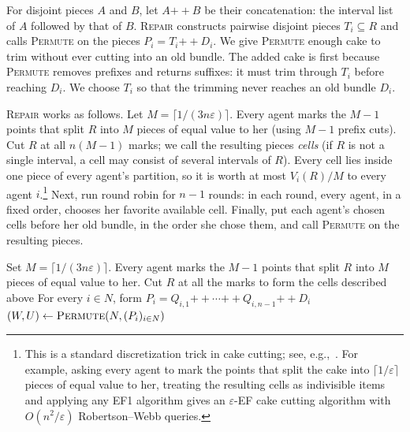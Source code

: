 \documentclass[11pt]{article}
\newcommand{\RRmark}[1]{\tikz[remember picture,overlay]{\coordinate (#1);}}
\newcommand{\eps}{\varepsilon}
\newcommand{\Repair}{\textsc{Repair}}
\newcommand{\Permute}{\textsc{Permute}}
\newcommand{\cat}{\mathbin{+\!\!+}}
\theoremstyle{plain}
\theoremstyle{definition}
\theoremstyle{plain}
\begin{document}
For disjoint pieces $A$ and $B$, let $A\cat B$ be their concatenation: the interval list of $A$ followed by that of $B$. \Repair{} constructs pairwise disjoint pieces $T_i\subseteq R$ and calls \Permute{} on the pieces $P_i=T_i\cat D_i$. We give \Permute{} enough cake to trim without ever cutting into an old bundle. The added cake is first because \Permute{} removes prefixes and returns suffixes: it must trim through $T_i$ before reaching $D_i$. We choose $T_i$ so that the trimming never reaches an old bundle $D_i$.




\Repair{} works as follows. Let $M=\lceil1/(3n\eps)\rceil$. Every agent marks the $M-1$ points that split $R$ into $M$ pieces of equal value to her (using $M-1$ prefix cuts). Cut $R$ at all $n(M-1)$ marks; we call the resulting pieces \emph{cells} (if $R$ is not a single interval, a cell may consist of several intervals of $R$). Every cell lies inside one piece of every agent's partition, so it is worth at most $V_i(R)/M$ to every agent $i$.\footnote{This is a standard discretization trick in cake cutting; see, e.g.,~\cite{balkanski2014simultaneous,branzei2022query}. For example, asking every agent to mark the points that split the cake into $\lceil1/\eps\rceil$ pieces of equal value to her, treating the resulting cells as indivisible items and applying any EF1 algorithm gives an $\eps$-EF cake cutting algorithm with $O(n^2/\eps)$ Robertson--Webb queries.} Next, run round robin for $n-1$ rounds: in each round, every agent, in a fixed order, chooses her favorite available cell. Finally, put each agent's chosen cells before her old bundle, in the order she chose them, and call \Permute{} on the resulting pieces. 


\begin{algorithm}[H]
\caption{$\Repair(N,D,R,\eps)$, where $n=|N|$}\label{alg:repair}
Set $M=\lceil1/(3n\eps)\rceil$. Every agent marks the $M-1$ points
that split $R$ into $M$ pieces of equal value to her.
Cut $R$ at all the marks to form the cells described above\;\label{line:rep:cells}
\RRmark{repair-rr-top}
%
For every $i \in N$, form
$P_i=Q_{i,1}\cat\cdots\cat Q_{i,n-1}\cat D_i$\;\label{rep:pieces}
$(W,U)\gets\Permute(N,(P_i)_{i \in N})$\;\label{rep:permute}
\;
\end{algorithm}
\end{document}
